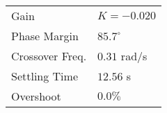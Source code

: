 \begin{tabular}{ll}
Gain & $K = -0.020$ \\
Phase Margin & $85.7^\circ$ \\
Crossover Freq. & $0.31$ rad/s \\
Settling Time & $12.56$ s \\
Overshoot & $0.0\%$ \\
\end{tabular}
